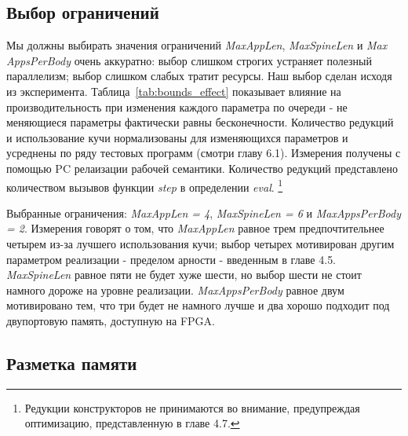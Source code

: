 \documentclass[flenqn, 14pt]{extarticle}
\begin{document}
\subsection{Выбор ограничений}
Мы должны выбирать значения ограничений \textit{MaxAppLen}, \textit{MaxSpineLen} и \textit{Max AppsPerBody} очень аккуратно: выбор слишком строгих устраняет полезный параллелизм; выбор слишком слабых тратит ресурсы. Наш выбор сделан исходя из эксперимента. Таблица~\ref{tab:bounds_effect} показывает влияние на производительность при изменения каждого параметра по очереди - не меняющиеся параметры фактически равны бесконечности. Количество редукций и использование кучи нормализованы для изменяющихся параметров и усреднены по ряду тестовых программ (смотри главу 6.1). Измерения получены с помощью PC релаизации рабочей семантики. Количество редукций представлено количеством вызывов функции \textit{step} в определении \textit{eval}. \footnote{Редукции конструкторов не принимаются во внимание, предупреждая оптимизацию, представленную в главе 4.7.} 

Выбранные ограничения: \textit{MaxAppLen = 4}, \textit{MaxSpineLen = 6} и \textit{MaxAppsPerBody = 2}. Измерения говорят о том, что \textit{MaxAppLen} равное трем предпочтительнее четырем из-за лучшего использования кучи; выбор четырех мотивирован другим параметром реализации - пределом арности - введенным в главе 4.5. \textit{MaxSpineLen} равное пяти не будет хуже шести, но выбор шести не стоит намного дороже на уровне реализации. \textit{MaxAppsPerBody} равное двум мотивировано тем, что три будет не намного лучше и два хорошо подходит под двупортовую память, доступную на FPGA.

\subsection{Разметка памяти}
\end{document}
